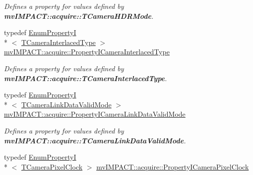 \begin{DoxyCompactItemize}
\begin{DoxyCompactList}\small\item\em Defines a property for values defined by {\bfseries mv\+I\+M\+P\+A\+C\+T\+::acquire\+::\+T\+Camera\+H\+D\+R\+Mode}. \end{DoxyCompactList}\item 
\hypertarget{group___device_specific_interface_gad01921546e8dc7787753af3e80401ab4}{typedef \hyperlink{classmv_i_m_p_a_c_t_1_1acquire_1_1_enum_property_i}{Enum\+Property\+I}\\*
$<$ \hyperlink{group___device_specific_interface_ga88ebb3c75921a96f51a3ea81ba253466}{T\+Camera\+Interlaced\+Type} $>$ \hyperlink{group___device_specific_interface_gad01921546e8dc7787753af3e80401ab4}{mv\+I\+M\+P\+A\+C\+T\+::acquire\+::\+Property\+I\+Camera\+Interlaced\+Type}}\label{group___device_specific_interface_gad01921546e8dc7787753af3e80401ab4}

\begin{DoxyCompactList}\small\item\em Defines a property for values defined by {\bfseries mv\+I\+M\+P\+A\+C\+T\+::acquire\+::\+T\+Camera\+Interlaced\+Type}. \end{DoxyCompactList}\item 
\hypertarget{group___device_specific_interface_gaf6940dc7fdb7d3db42b5cace6bca208b}{typedef \hyperlink{classmv_i_m_p_a_c_t_1_1acquire_1_1_enum_property_i}{Enum\+Property\+I}\\*
$<$ \hyperlink{group___device_specific_interface_gab4d89af185da36c227fc9dc396e97e9f}{T\+Camera\+Link\+Data\+Valid\+Mode} $>$ \hyperlink{group___device_specific_interface_gaf6940dc7fdb7d3db42b5cace6bca208b}{mv\+I\+M\+P\+A\+C\+T\+::acquire\+::\+Property\+I\+Camera\+Link\+Data\+Valid\+Mode}}\label{group___device_specific_interface_gaf6940dc7fdb7d3db42b5cace6bca208b}

\begin{DoxyCompactList}\small\item\em Defines a property for values defined by {\bfseries mv\+I\+M\+P\+A\+C\+T\+::acquire\+::\+T\+Camera\+Link\+Data\+Valid\+Mode}. \end{DoxyCompactList}\item 
\hypertarget{group___device_specific_interface_ga346a75ab93c8255ce16833b47718680d}{typedef \hyperlink{classmv_i_m_p_a_c_t_1_1acquire_1_1_enum_property_i}{Enum\+Property\+I}\\*
$<$ \hyperlink{group___device_specific_interface_ga1f8b8cce27b21801b19c30f2aafae508}{T\+Camera\+Pixel\+Clock} $>$ \hyperlink{group___device_specific_interface_ga346a75ab93c8255ce16833b47718680d}{mv\+I\+M\+P\+A\+C\+T\+::acquire\+::\+Property\+I\+Camera\+Pixel\+Clock}}\label{group___device_specific_interface_ga346a75ab93c8255ce16833b47718680d}


\end{DoxyCompactItemize}
